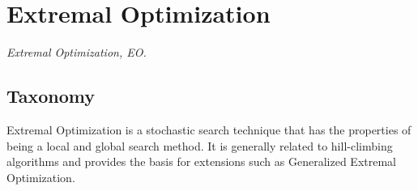 

\section{Extremal Optimization} 
\label{sec:extremal_optimization}

\emph{Extremal Optimization, EO.}

\subsection{Taxonomy}
Extremal Optimization is a stochastic search technique that has the properties of being a local and global search method.
It is generally related to hill-climbing algorithms and provides the basis for extensions such as Generalized Extremal Optimization.

